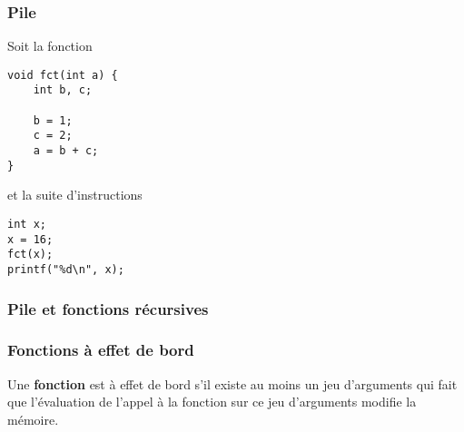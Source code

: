 \begin{frame}[fragile] \frametitle{Pile}
Soit la fonction 
\begin{lstlisting}
void fct(int a) {
    int b, c;
    
    b = 1;
    c = 2;
    a = b + c;
}
\end{lstlisting}
et la suite d'instructions
\begin{lstlisting}
int x;
x = 16;
fct(x);
printf("%d\n", x);
\end{lstlisting}

\begin{center}
\end{center}
\end{frame}

\begin{frame}[fragile] \frametitle{Pile et fonctions récursives}
\begin{center}
\end{center}
\end{frame}

\begin{frame}[fragile]\frametitle{Fonctions à effet de bord}
Une {\bf fonction} est à \alert{effet de bord} s'il existe au
moins un jeu d'arguments qui fait que l'évaluation de l'appel
à la fonction sur ce jeu d'arguments modifie la mémoire.
\bigskip

\begin{multicols}{2}
\begin{semiverbatim}
\end{semiverbatim}
\end{multicols}
\medskip

\begin{multicols}{2}
\begin{semiverbatim}
\end{semiverbatim}
\end{multicols}
\end{frame}

